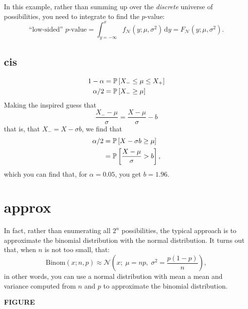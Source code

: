 In this example, rather than summing up over the \emph{discrete} universe of possibilities, you need to integrate to find the $p$-value:
\begin{equation}
  \text{``low-sided'' $p$-value} = \int_{y=-\infty}^x f_\mathcal{N}(y; \mu, \sigma^2) \,\mathrm{d}y = F_\mathcal{N}(y; \mu, \sigma^2).
\end{equation}

\subsection{cis}

\begin{align}
1 - \alpha &= \mathbb{P}\left[{X_- \leq \mu \leq X_+}\right] \\
\alpha / 2 &= \mathbb{P}\left[{X_- \geq \mu}\right]
\end{align}
Making the inspired guess that
\begin{equation}
  \frac{X_- - \mu}{\sigma} = \frac{X - \mu}{\sigma} - b
\end{equation}
that is, that $X_- = X - \sigma b$, we find that
\begin{align}
  \alpha/2 &= \mathbb{P}\left[{X - \sigma b \geq \mu}\right] \\
  &= \mathbb{P}\left[{\frac{X - \mu}{\sigma} > b}\right],
\end{align}
which you can find that, for $\alpha = 0.05$, you get $b = 1.96$.


\section{approx}

In fact, rather than enumerating all $2^n$ possibilities, the typical approach
is to approximate the binomial distribution with the normal distribution. It turns out that, when $n$ is not too small, that:
\begin{equation}
    \mathrm{Binom}(x; n, p) \approx \mathcal{N}\left(x; \; \mu = np, \; \sigma^2 = \frac{p (1-p)}{n}\right),
\end{equation}
in other words, you can use a normal distribution with mean a mean and variance
computed from $n$ and $p$ to approximate the binomial distribution.

\textbf{FIGURE}

